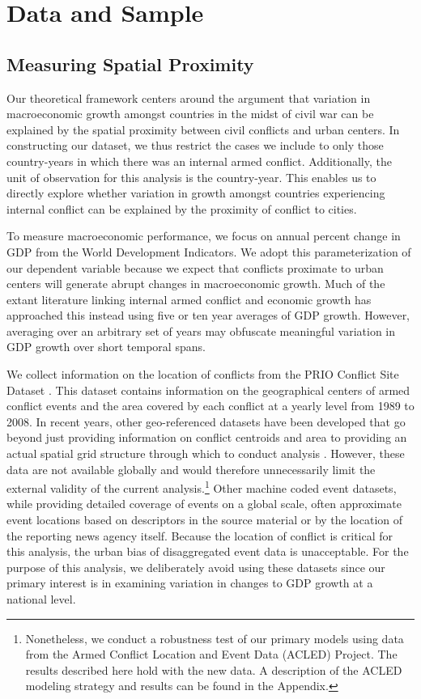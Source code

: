 
\section{Data and Sample}
\label{empirics}

\subsection{Measuring Spatial Proximity}

Our theoretical framework centers around the argument that variation in macroeconomic growth amongst countries in the midst of civil war can be explained by the spatial proximity between civil conflicts and urban centers. In constructing our dataset, we thus restrict the cases we include to only those country-years in which there was an internal armed conflict. Additionally, the unit of observation for this analysis is the country-year. This enables us to directly explore whether variation in growth amongst countries experiencing internal conflict can be explained by the proximity of conflict to cities.

To measure macroeconomic performance, we focus on annual percent change in GDP from the World Development Indicators. We adopt this parameterization of our dependent variable because we expect that conflicts proximate to urban centers will generate abrupt changes in macroeconomic growth. Much of the extant literature linking internal armed conflict and economic growth has approached this instead using five or ten year averages of GDP growth. However, averaging over an arbitrary set of years may obfuscate meaningful variation in GDP growth over short temporal spans.

We collect information on the location of conflicts from the PRIO Conflict Site Dataset \citep{hallberg:2012}. This dataset contains information on the geographical centers of armed conflict events and the area covered by each conflict at a yearly level from 1989 to 2008. In recent years, other geo-referenced datasets have been developed that go beyond just providing information on conflict centroids and area to providing an actual spatial grid structure through which to conduct analysis \citep{tollefsen:etal:2012}. However, these data are not available globally and would therefore unnecessarily limit the external validity of the current analysis.\footnote{Nonetheless, we conduct a robustness test of our primary models using data from the Armed Conflict Location and Event Data (ACLED) Project. The results described here hold with the new data. A description of the ACLED modeling strategy and results can be found in the Appendix.} Other machine coded event datasets, while providing detailed coverage of events on a global scale, often approximate event locations based on descriptors in the source material or by the location of the reporting news agency itself. Because the location of conflict is critical for this analysis, the urban bias of disaggregated event data is unacceptable. For the purpose of this analysis, we deliberately avoid using these datasets since our primary interest is in examining variation in changes to GDP growth at a national level. 

